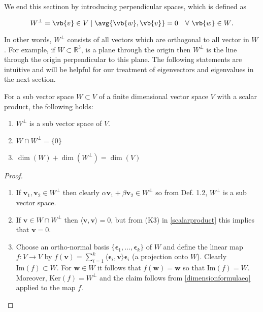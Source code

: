 \documentclass[a4paper,12pt]{report}
\begin{document}
We end this sectinon by introducing perpendicular spaces, which is defined as 

\begin{equation}
    W^{\perp } = {\vb{v} \in V \mid \avg{\vb{w} ,\vb{v} }= 0 ~~~\forall ~ \vb{w} \in W }.
\end{equation}

In other words, \(W^{\perp } \) consists of all vectors which are orthogonal to all vector in \(W\). For example, if \(W \subset \mathbb{R}^3 \), is a plane through the origin then \(W^{\perp } \)  is the line through the origin perpendicular to this plane. The following statements are intuitive and will be helpful for our treatment of eigenvectors and eigenvalues in the next section.    



\begin{lemma} \label{perpspaceprop} 

For a sub vector space \(W \subset V\) of a finite dimensional vector space \(V\) with a scalar product, the following holds:
\begin{enumerate}[label=(L\arabic*)]
    \item \(W^\perp\) is a sub vector space of \(V\).
    \item \(W \cap W^\perp = \{0\}\)
    \item \(\dim(W) + \dim(W^\perp) = \dim(V)\)
\end{enumerate}
\end{lemma}

\begin{proof}
\begin{enumerate}[label=(L\arabic*)]
    \item If \(\mathbf{v}_1, \mathbf{v}_2 \in W^\perp\) then clearly \(\alpha \mathbf{v}_1 + \beta \mathbf{v}_2 \in W^\perp\) so from Def. 1.2, \(W^\perp\) is a sub vector space.
    \item If \(\mathbf{v} \in W \cap W^\perp\) then \(\langle \mathbf{v}, \mathbf{v} \rangle = 0\), but from (K3) in \cref{scalarproduct}  this implies that \(\mathbf{v} = 0\).
    \item Choose an ortho-normal basis \(\{\bm{\epsilon}_1, \ldots, \bm{\epsilon}_k\}\) of \(W\) and define the linear map \(f : V \to V\) by \(f(\mathbf{v}) = \sum_{i=1}^{k} \langle \bm{\epsilon}_i, \mathbf{v} \rangle \bm{\epsilon}_i\) (a projection onto \(W\)). Clearly \(\text{Im}(f) \subset W\). For \(\mathbf{w} \in W\) it follows that \(f(\mathbf{w}) = \mathbf{w}\) so that \(\text{Im}(f) = W\). Moreover, \(\text{Ker}(f) = W^\perp\) and the claim follows from \cref{dimensionformulaeq}  applied to the map \(f\).
\end{enumerate}
\end{proof}
\end{document}
